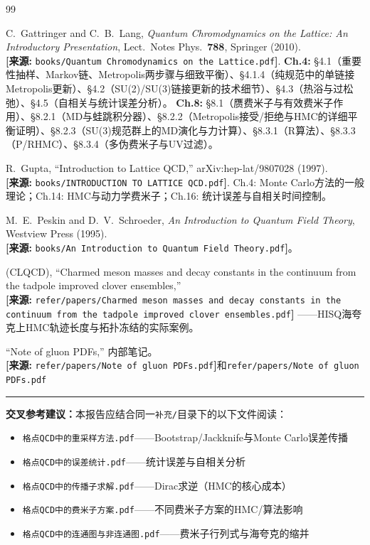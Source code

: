 \documentclass[12pt,a4paper]{ctexart}
\theoremstyle{definition}
\begin{document}
\begin{thebibliography}{99}

C.~Gattringer and C.~B.~Lang,
\textit{Quantum Chromodynamics on the Lattice: An Introductory Presentation},
Lect.\ Notes Phys.\ \textbf{788}, Springer (2010).
\\\textbf{[来源:} \texttt{books/Quantum Chromodynamics on the Lattice.pdf}\textbf{]}.
\textbf{Ch.4:} §4.1（重要性抽样、Markov链、Metropolis两步骤与细致平衡）、§4.1.4（纯规范中的单链接Metropolis更新）、§4.2（SU(2)/SU(3)链接更新的技术细节）、§4.3（热浴与过松弛）、§4.5（自相关与统计误差分析）。
\textbf{Ch.8:} §8.1（赝费米子与有效费米子作用）、§8.2.1（MD与蛙跳积分器）、§8.2.2（Metropolis接受/拒绝与HMC的详细平衡证明）、§8.2.3（SU(3)规范群上的MD演化与力计算）、§8.3.1（R算法）、§8.3.3（P/RHMC）、§8.3.4（多伪费米子与UV过滤）。

R.~Gupta,
``Introduction to Lattice QCD,''
arXiv:hep-lat/9807028 (1997).
\\\textbf{[来源:} \texttt{books/INTRODUCTION TO LATTICE QCD.pdf}\textbf{]}.
Ch.4: Monte Carlo方法的一般理论；Ch.14: HMC与动力学费米子；Ch.16: 统计误差与自相关时间控制。

M.~E.~Peskin and D.~V.~Schroeder,
\textit{An Introduction to Quantum Field Theory}, Westview Press (1995).
\\\textbf{[来源:} \texttt{books/An Introduction to Quantum Field Theory.pdf}\textbf{]}。

(CLQCD),
``Charmed meson masses and decay constants in the continuum from the tadpole improved clover ensembles,''
\\\textbf{[来源:} \texttt{refer/papers/Charmed meson masses and decay constants in the continuum from the tadpole improved clover ensembles.pdf}\textbf{]}
——HISQ海夸克上HMC轨迹长度与拓扑冻结的实际案例。

``Note of gluon PDFs,'' 内部笔记。
\\\textbf{[来源:} \texttt{refer/papers/Note of gluon PDFs.pdf}\textbf{]}和\texttt{refer/papers/Note of gluon PDFs.pdf}

\end{thebibliography}

\vspace{0.5cm}
\noindent\rule{\textwidth}{0.5pt}
\small
\textbf{交叉参考建议：}本报告应结合同一\texttt{补充/}目录下的以下文件阅读：
\begin{itemize}[nosep]
    \item \texttt{格点QCD中的重采样方法.pdf}——Bootstrap/Jackknife与Monte Carlo误差传播
    \item \texttt{格点QCD中的误差统计.pdf}——统计误差与自相关分析
    \item \texttt{格点QCD中的传播子求解.pdf}——Dirac求逆（HMC的核心成本）
    \item \texttt{格点QCD中的费米子方案.pdf}——不同费米子方案的HMC/算法影响
    \item \texttt{格点QCD中的连通图与非连通图.pdf}——费米子行列式与海夸克的缩并
\end{itemize}
\end{document}
